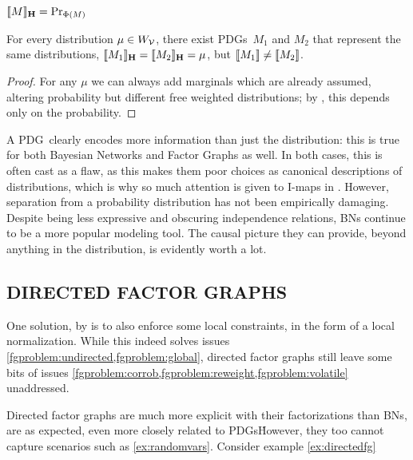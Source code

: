 \documentclass{article}
\newcommand\MaxEnt{_{\mathbf H}}
\newcommand{\MN}{PDG}
\newcommand{\MNs}{\MN s}
\numberwithin{equation}{section}
\begin{document}
	
	
	\begin{conj}\label{thm:noninj}
		$\bbr{M}\MaxEnt = \Pr_{\Phi(M)}$
	\end{conj}
	\begin{coro}\label{coro:same-dist;different-weight}
		For every distribution $\mu \in W_{\cal V}$, there exist \MNs\ $M_1$ and $M_2$ that represent the same distributions, $\bbr{M_1}\MaxEnt=\bbr{M_2}\MaxEnt=\mu$, but $\llbracket M_1\rrbracket \neq \llbracket M_2\rrbracket$. 
	\end{coro}
	\begin{proof}
		For any $\mu$ we can always add marginals which are already assumed, altering probability but different free weighted distributions; by , this depends only on the probability.
	\end{proof}
	
	A \MN\ clearly encodes more information than just the distribution: this is true for both Bayesian Networks and Factor Graphs as well. In both cases, this is often cast as a flaw, as this makes them poor choices as canonical descriptions of distributions, which is why so much attention is given to I-maps in \parencite{koller2009probabilistic}. However, separation from a probability distribution has not been empirically damaging. Despite being less expressive and obscuring independence relations, BNs continue to be a more popular modeling tool. The causal picture they can provide, beyond anything in the distribution, is evidently worth a lot.




	\subsection{DIRECTED FACTOR GRAPHS}
	
	One solution, by \parencite{frey2012extending} is to also enforce some local constraints, in the form of a local normalization.  While this indeed solves issues \cref{fgproblem:undirected,fgproblem:global}, directed factor graphs still leave some bits of issues \cref{fgproblem:corrob,fgproblem:reweight,fgproblem:volatile} unaddressed.
	
	Directed factor graphs are much more explicit with their factorizations than BNs, are as expected, even more closely related to \MNs\. However, they too cannot capture scenarios such as \cref{ex:randomvars}. Consider example \ref{ex:directedfg}
	
	\begin{example}\label{ex:directedfg}
	\end{example}
\end{document}
